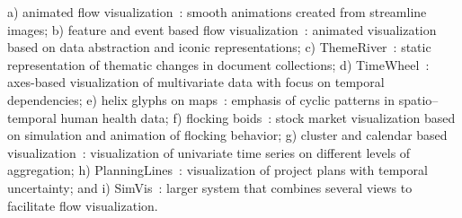 a) animated flow visualization~\citep{van2002image}: smooth animations created from streamline images;
b) feature and event based flow visualization~\citep{reinders2001visualization}: animated visualization based on data abstraction and iconic representations;
c) ThemeRiver~\citep{havre2002themeriver}: static representation of thematic changes in document collections;
d) TimeWheel~\citep{tominski2004axes}: axes-based visualization of multivariate data with focus on temporal dependencies;
e) helix glyphs on maps~\citep{tominski20053d}: emphasis of cyclic patterns in spatio–temporal human health data;
f) flocking boids~\citep{moere2004time}: stock market visualization based on simulation and animation of flocking behavior;
g) cluster and calendar based visualization~\citep{van1999cluster}: visualization of univariate time series on different levels of aggregation;
h) PlanningLines~\citep{aigner2005planninglines}: visualization of project plans with temporal uncertainty; and
i) SimVis~\citep{doleisch2004case}: larger system that combines several views to facilitate flow visualization.